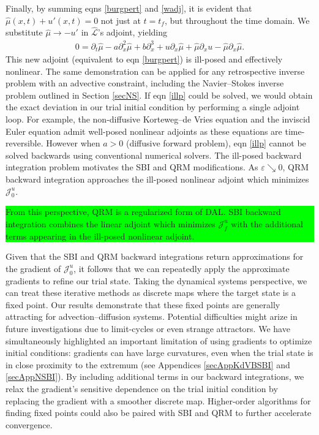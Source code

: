 \documentclass[%
 reprint,
 amsmath,amssymb,
 aps,
 pre,
]{revtex4-2}
\newcommand{\hly}[1]{\colorbox{lime}{\parbox{\columnwidth}{#1}}}
\renewcommand\L {\mathcal{L}}
\newcommand{\Juo}{\mathcal{J}^{u}_0}
\newcommand{\Juf}{\mathcal{J}^{u}_f}
\begin{document}
Finally, by summing eqns \ref{burgpert} and \ref{wadj}, it is evident that $\hat{\mu}(x,t) + u'(x,t) = 0$ not just at $t=t_f$, but throughout the time domain. 
We substitute $\hat{\mu}\to -u'$ in $\hat{\L}$'s adjoint, yielding
\begin{align}
  0 = \partial_t \hat{\mu} - a\partial_x^2 \hat{\mu} + b\partial_x^3 + u\partial_x \hat{\mu} + \hat{\mu}\partial_x u - \hat{\mu}\partial_x \hat{\mu} \label{illp}.
\end{align}
This new adjoint (equivalent to eqn \ref{burgpert}) is ill-posed and effectively nonlinear.
The same demonstration can be applied for any retrospective inverse problem with an advective constraint, including the Navier--Stokes inverse problem outlined in Section \ref{secNS}.
If eqn \ref{illp} could be solved, we would obtain the exact deviation in our trial initial condition by performing a single adjoint loop. 
For example, the non-diffusive Korteweg--de Vries equation and the inviscid Euler equation admit well-posed nonlinear adjoints as these equations are time-reversible.
However when $a>0$ (diffusive forward problem), eqn \ref{illp} cannot be solved backwards using conventional numerical solvers.
The ill-posed backward integration problem motivates the SBI and QRM modifications.
As $\varepsilon\searrow 0$, QRM backward integration approaches the ill-posed nonlinear adjoint which minimizes $\Juo$.
\hly{From this perspective, QRM is a regularized form of DAL.
SBI backward integration combines the linear adjoint which minimizes $\Juf$ with the additional terms appearing in the ill-posed nonlinear adjoint.}

Given that the SBI and QRM backward integrations return approximations for the gradient of $\Juo$, it follows that we can repeatedly apply the approximate gradients to refine our trial state.
Taking the dynamical systems perspective, we can treat these iterative methods as discrete maps where the target state is a fixed point.
Our results demonstrate that these fixed points are generally attracting for advection--diffusion systems.
Potential difficulties might arize in future investigations due to limit-cycles or even strange attractors.
We have simultaneously highlighted an important limitation of using gradients to optimize initial conditions: gradients can have large curvatures, even when the trial state is in close proximity to the extremum (see Appendices \ref{secAppKdVBSBI} and \ref{secAppNSBI}).
By including additional terms in our backward integrations, we relax the gradient's sensitive dependence on the trial initial condition by replacing the gradient with a smoother discrete map.
Higher-order algorithms for finding fixed points could also be paired with SBI and QRM to further accelerate convergence.
\end{document}
